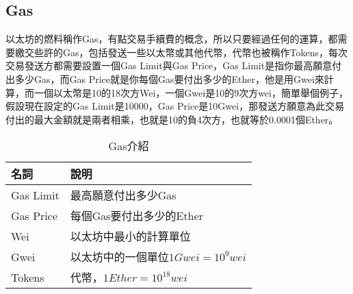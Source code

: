\subsection{Gas}
以太坊的燃料稱作Gas，有點交易手續費的概念，所以只要經過任何的運算，都需要繳交些許的Gas，包括發送一些以太幣或其他代幣，代幣也被稱作Tokens，每次交易發送方都需要設置一個Gas Limit與Gas Price，Gas Limit是指你最高願意付出多少Gas，而Gas Price就是你每個Gas要付出多少的Ether，他是用Gwei來計算，而一個以太幣是10的18次方Wei，一個Gwei是10的9次方wei，簡單舉個例子，假設現在設定的Gas Limit是10000，Gas Price是10Gwei，那發送方願意為此交易付出的最大金額就是兩者相乘，也就是10的負4次方，也就等於0.0001個Ether。
\begin{table}[h]
\begin{center}
\caption{Gas介紹}\label{tb:Gas}
\extrarowheight=4pt
\begin{tabular}{ll}
\rowcolor[gray]{.9}
名詞			&	說明\\
\toprule
Gas Limit	&	最高願意付出多少Gas\\
Gas Price	&	每個Gas要付出多少的Ether\\
Wei      	&	以太坊中最小的計算單位\\
Gwei      	&	以太坊中的一個單位$1Gwei=10^9wei$\\
Tokens	    &	代幣，$1Ether=10^{18}wei$\\
\bottomrule
\end{tabular}
\end{center}
\vspace{1cm}
\end{table}

